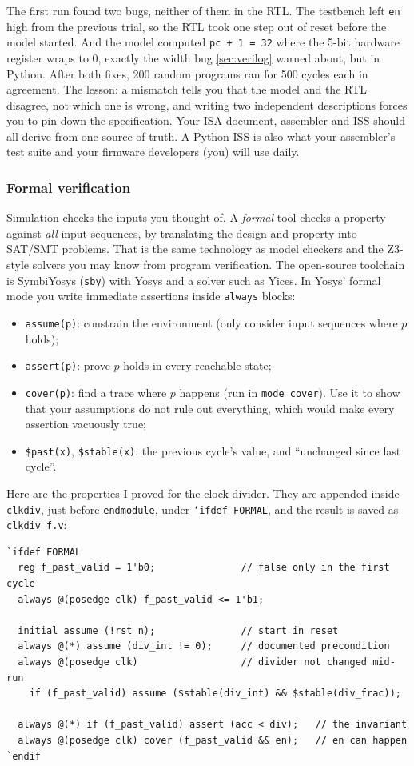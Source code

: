 The first run found two bugs, neither of them in the RTL. The testbench
left \texttt{en} high from the previous trial, so the RTL took one step out
of reset before the model started. And the model computed
\texttt{pc + 1 = 32} where the 5-bit hardware register wraps to 0, exactly
the width bug \cref{sec:verilog} warned about, but in Python. After both
fixes, 200 random programs ran for 500 cycles each in agreement. The lesson:
a mismatch tells you that the model and the RTL disagree, not which one is
wrong, and writing two independent descriptions forces you to pin down the
specification. Your ISA document, assembler and ISS should all derive from
one source of truth. A Python ISS is also what your assembler's test suite
and your firmware developers (you) will use daily.

\subsubsection{Formal verification}
Simulation checks the inputs you thought of. A \emph{formal} tool checks a
property against \emph{all} input sequences, by translating the design and
property into SAT/SMT problems. That is the same technology as model
checkers and the Z3-style solvers you may know from program verification.
The open-source toolchain is SymbiYosys (\texttt{sby}) with Yosys and a
solver such as Yices. In Yosys' formal mode you write immediate assertions
inside \texttt{always} blocks:
\begin{itemize}
  \item \texttt{assume(p)}: constrain the environment (only consider input
    sequences where $p$ holds);
  \item \texttt{assert(p)}: prove $p$ holds in every reachable state;
  \item \texttt{cover(p)}: find a trace where $p$ happens (run in
    \texttt{mode cover}). Use it to show that your assumptions do not rule
    out everything, which would make every assertion vacuously true;
  \item \texttt{\$past(x)}, \texttt{\$stable(x)}: the previous cycle's value,
    and ``unchanged since last cycle''.
\end{itemize}
Here are the properties I proved for the clock divider. They are appended
inside \texttt{clkdiv}, just before \texttt{endmodule}, under
\texttt{`ifdef FORMAL}, and the result is saved as \texttt{clkdiv\_f.v}:
{\small
\begin{verbatim}
`ifdef FORMAL
  reg f_past_valid = 1'b0;               // false only in the first cycle
  always @(posedge clk) f_past_valid <= 1'b1;

  initial assume (!rst_n);               // start in reset
  always @(*) assume (div_int != 0);     // documented precondition
  always @(posedge clk)                  // divider not changed mid-run
    if (f_past_valid) assume ($stable(div_int) && $stable(div_frac));

  always @(*) if (f_past_valid) assert (acc < div);   // the invariant
  always @(posedge clk) cover (f_past_valid && en);   // en can happen
`endif
\end{verbatim}
}
